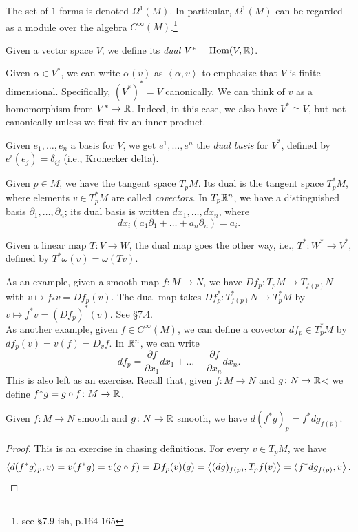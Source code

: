 The set of $1$-forms is denoted $\Omega^1(M)$. In particular, $\Omega^1(M)$ can be regarded as a module over the algebra $C^\infty(M)$.\footnote{see \S7.9 ish, p.164-165}
\begin{definition}[p.159; \S7.2]
    Given a vector space $V$, we define its \textit{dual} $V^\ast = \operatorname{Hom}(V, \mathbb R)$. 
\end{definition}
Given $\alpha \in V^\ast$, we can write $\alpha(v)$ as $\left<\alpha, v\right>$ to emphasize that $V$ is finite-dimensional. Specifically, $(V^\ast)^\ast = V$ canonically. We can think of $v$ as a homomorphism from $V^\ast \to \mathbb R$. Indeed, in this case, we also have $V^\ast \cong V$, but not canonically unless we first fix an inner product.
\begin{definition}
    Given $e_1, \dots, e_n$ a basis for $V$, we get $e^1, \dots, e^n$ the \textit{dual basis} for $V^\ast$, defined by $e^i(e_j) = \delta_{ij}$ (i.e., Kronecker delta).
\end{definition}
Given $p \in M$, we have the tangent space $T_p M$. Its dual is the tangent space $T_p^\ast M$, where elements $v \in T_p^\ast M$ are called \textit{covectors}. In $T_p \mathbb R^n$, we have a distinguished basis $\partial_1, \dots, \partial_n$; its dual basis is written $dx_1, \dots, dx_n$, where
\[ dx_i(a_1 \partial_1 + \dots + a_n \partial_n) = a_i. \]
\vspace{-24pt}
\begin{definition}
    Given a linear map $T \colon V \to W$, the dual map goes the other way, i.e., $T^\ast \colon W^\ast \to V^\ast$, defined by $T^\ast \omega(v) = \omega(Tv)$.
\end{definition}
As an example, given a smooth map $f \colon M \to N$, we have $Df_p \colon T_p M \to T_{f(p)} N$ with $v \mapsto f_\ast v = Df_p(v)$. The dual map takes $Df_p^\ast \colon T_{f(p)}^\ast N \to T_p^\ast M$ by $v \mapsto f^\ast v = (Df_p)^\ast(v)$. See \S7.4.
\\[8pt]
As another example, given $f \in C^\infty(M)$, we can define a covector $df_p \in T_p^\ast M$ by $df_p(v) = v(f) = D_v f$. In $\mathbb R^n$, we can write
\[ df_p = \frac{\partial f}{\partial x_1} dx_1 + \dots + \frac{\partial f}{\partial x_n} dx_n. \]
This is also left as an exercise. Recall that, given $f \colon M \to N$ and $g \colon N \to \mathbb R$< we define $f^\ast g = g \circ f \colon M \to \mathbb R$.
\begin{proposition}[\S7.6]
    Given $f \colon M \to N$ smooth and $g \colon N \to \mathbb R$ smooth, we have $d(f^\ast g)_p = f^\ast dg_{f(p)}$.
\end{proposition}
\begin{proof}
    This is an exercise in chasing definitions. For every $v \in T_p M$, we have
    \[ \left<d (f^\ast g)_p, v\right> = v(f^\ast g) = v(g \circ f) = Df_p(v)(g) = \left<(dg)_{f(p)}, T_p f(v)\right> = \left<f^\ast dg_{f(p)}, v\right>. \qedhere \]
\end{proof}
